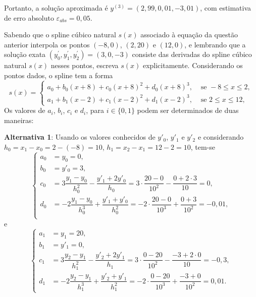 \documentclass[12pt,a4paper]{article}
\begin{document}
\begin{ExerciseList}
Portanto, a solução aproximada é $\boxed{y^{(3)} = (2,99, 0,01, -3,01)}$, com estimativa de erro absoluto $\boxed{\varepsilon_{abs} = 0,05}$.

\Exercise[title={2,0}] Sabendo que o spline cúbico natural $s(x)$ associado à equação da questão anterior interpola os pontos $(-8, 0)$, $(2, 20)$ e $(12, 0)$, e lembrando que a solução exata $(y_0^\prime, y_1^\prime, y_2^\prime) = (3, 0, -3)$ consiste das derivadas do spline cúbico natural $s(x)$ nesses pontos, escreva $s(x)$ explicitamente.
\Answer Considerando os pontos dados, o spline tem a forma
\[
  s(x) =
  \begin{cases}
    a_0 + b_0(x + 8) + c_0(x + 8)^2 +d_0(x + 8)^3, & \text{ se } -8 \leq x \leq 2,\\
    a_1 + b_1(x - 2) + c_1(x - 2)^2 +d_1(x - 2)^3, & \text{ se } 2 \leq x \leq 12,
  \end{cases}
\]
Os valores de $a_i$, $b_i$, $c_i$ e $d_i$, para $i \in \{0, 1\}$ podem ser determinados de duas maneiras:

\textbf{Alternativa 1}: Usando os valores conhecidos de $y'_0$, $y'_1$ e $y'_2$ e considerando $h_0 = x_1 - x_0 = 2 - (-8) = 10$, $h_1 = x_2 - x_1 = 12 - 2 = 10$, tem-se
\[
\begin{cases}
  a_0 & = y_0 = 0,\\
  b_0 & = y'_0 = 3,\\
  c_0 & = 3\dfrac{y_1-y_0}{h_0^2}-\dfrac{y'_1+2y'_0}{h_0}
        = 3\cdot \dfrac{20-0}{10^2}-\dfrac{0 + 2\cdot 3}{10}
        = 0,\\
  d_0 & = -2\dfrac{y_1-y_0}{h_0^3}+\dfrac{y'_1+y'_0}{h_0^2}
        = -2\cdot \dfrac{20-0}{10^3}+\dfrac{0+3}{10^2}
        = -0,01,\\
\end{cases}
\]
e
\[
\begin{cases}
  a_1 & = y_1 = 20,\\
  b_1 & = y'_1 = 0,\\
  c_1 & = 3\dfrac{y_2-y_1}{h_1^2}-\dfrac{y'_2+2y'_1}{h_1}
        = 3\cdot \dfrac{0-20}{10^2}-\dfrac{-3 + 2\cdot 0}{10}
        = -0,3,\\
  d_1 & = -2\dfrac{y_2-y_1}{h_1^3}+\dfrac{y'_2+y'_1}{h_1^2}
        = -2\cdot \dfrac{0-20}{10^3}+\dfrac{-3+0}{10^2}
        = 0,01.
\end{cases}
\]


\end{ExerciseList}
\end{document}

